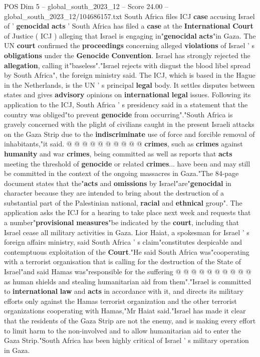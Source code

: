 \begin{textsample}{POS Dim 5 – global\_south\_2023\_12 – Score 24.00 – global\_south\_2023\_12/104686157.txt}  \label{ex:f5_pos_101}
South Africa files ICJ \textbf{case} accusing Israel of ' \textbf{genocidal} \textbf{acts} ' South Africa has filed a \textbf{case} at the \textbf{International} \textbf{Court} of Justice ( ICJ ) alleging that Israel is engaging in"\textbf{genocidal} \textbf{acts}"in Gaza.
The UN \textbf{court} confirmed the \textbf{proceedings} concerning alleged \textbf{violations} of Israel ' s \textbf{obligations} under the \textbf{Genocide} \textbf{Convention}.
Israel has strongly rejected the \textbf{allegation}, calling it"baseless"."Israel rejects with disgust the blood libel spread by South Africa", the foreign ministry said.
The ICJ, which is based in the Hague in the Netherlands, is the UN ' s principal \textbf{legal} body.
It settles disputes between states and gives \textbf{advisory} opinions on \textbf{international} \textbf{legal} issues.
Following its application to the ICJ, South Africa ' s presidency said in a statement that the country was obliged"to prevent \textbf{genocide} from occurring"."South Africa is gravely concerned with the plight of civilians caught in the present Israeli attacks on the Gaza Strip due to the \textbf{indiscriminate} use of force and forcible removal of inhabitants,"it said. @ @ @ @ @ @ @ @ @ @ \textbf{crimes}, such as \textbf{crimes} against \textbf{humanity} and war \textbf{crimes}, being committed as well as reports that \textbf{acts} meeting the threshold of \textbf{genocide} or related \textbf{crimes}... have been and may still be committed in the context of the ongoing massacres in Gaza."The 84-page document states that the"\textbf{acts} and \textbf{omissions} by Israel"are"\textbf{genocidal} in character because they are intended to bring about the destruction of a substantial part of the Palestinian national, \textbf{racial} and \textbf{ethnical} group".
The application asks the ICJ for a hearing to take place next week and requests that a number"\textbf{provisional} \textbf{measures}"be indicated by the \textbf{court}, including that Israel cease all military activities in Gaza.
Lior Haiat, a spokesman for Israel ' s foreign affairs ministry, said South Africa ' s claim"constitutes despicable and contemptuous exploitation of the \textbf{Court}."He said South Africa was"cooperating with a terrorist organisation that is calling for the destruction of the State of Israel"and said Hamas was"responsible for the suffering @ @ @ @ @ @ @ @ @ @ as human shields and stealing humanitarian aid from them"."Israel is committed to \textbf{international} \textbf{law} and \textbf{acts} in accordance with it, and directs its military efforts only against the Hamas terrorist organization and the other terrorist organizations cooperating with Hamas,"Mr Haiat said."Israel has made it clear that the residents of the Gaza Strip are not the enemy, and is making every effort to limit harm to the non-involved and to allow humanitarian aid to enter the Gaza Strip."South Africa has been highly critical of Israel ' s military operation in Gaza.

\end{textsample}
